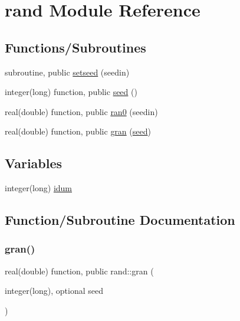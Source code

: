 \hypertarget{namespacerand}{}\section{rand Module Reference}
\label{namespacerand}
\subsection*{Functions/\+Subroutines}
\begin{DoxyCompactItemize}
\item 
subroutine, public \hyperlink{namespacerand_a632224183164f720bd47baa916a5ab8b}{setseed} (seedin)
\item 
integer(long) function, public \hyperlink{namespacerand_a0bf2019d6e29304bea88b6dfc7277e96}{seed} ()
\item 
real(double) function, public \hyperlink{namespacerand_a750567ffa303a800f86ffc3bd5705137}{ran0} (seedin)
\item 
real(double) function, public \hyperlink{namespacerand_a7bf88c16a64dbc594c0b21871f34e15c}{gran} (\hyperlink{namespacerand_a0bf2019d6e29304bea88b6dfc7277e96}{seed})
\end{DoxyCompactItemize}
\subsection*{Variables}
\begin{DoxyCompactItemize}
\item 
integer(long) \hyperlink{namespacerand_a8271f5341966bf15edcabc95e23ffcec}{idum}
\end{DoxyCompactItemize}


\subsection{Function/\+Subroutine Documentation}
\mbox{\label{namespacerand_a7bf88c16a64dbc594c0b21871f34e15c}} 
\subsubsection{\texorpdfstring{gran()}{gran()}}
{\footnotesize\ttfamily real(double) function, public rand\+::gran (\begin{DoxyParamCaption}\item[{integer(long), optional}]{seed }\end{DoxyParamCaption})}

